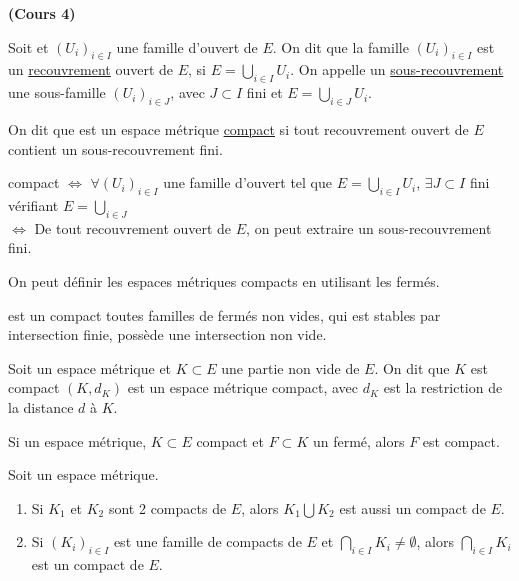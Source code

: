 \documentclass[12pt,a4paper]{article}
\begin{document}
\begin{flushleft}
\textbf{(Cours 4)}
\begin{mydef}
Soit \edm et $(U_i)_{i \in I}$ une famille d'ouvert de $E$. On dit que la famille $(U_i)_{i \in I}$ est un \underline{recouvrement} ouvert de $E$, si $E = \bigcup\limits_{i \in I} U_i$. On appelle un \underline{sous-recouvrement} une sous-famille $(U_i)_{i \in J}$, avec $J \subset I$ fini et $E = \bigcup\limits_{i \in J} U_i$.
\end{mydef}
 
\begin{mydef}
On dit que \edm est un espace métrique \underline{compact} si tout recouvrement ouvert de $E$ contient un sous-recouvrement fini.
\end{mydef} 
 
\begin{rem}
\edm compact $\Leftrightarrow$ $\forall (U_i)_{i \in I}$ une famille d'ouvert tel que $E = \bigcup\limits_{i \in I} U_i$, $\exists J \subset I$ fini vérifiant $E = \bigcup\limits_{i \in J}$\\$\Leftrightarrow$ De tout recouvrement ouvert de $E$, on peut extraire un sous-recouvrement fini.
\end{rem}

\begin{rem}
On peut définir les espaces métriques compacts en utilisant les fermés.
\end{rem}

\begin{thm}
\edm est un compact \ssi toutes familles de fermés non vides, qui est stables par intersection finie, possède une intersection non vide.
\end{thm}

\begin{mydef}
Soit \edm un espace métrique et $K \subset E$ une partie non vide de $E$. On dit que $K$ est compact \ssi $(K, d_K)$ est un espace métrique compact, avec $d_K$ est la restriction de la distance $d$ à $K$.
\end{mydef}


\begin{thm}
Si \edm un espace métrique, $K \subset E$ compact et $F \subset K$ un fermé, alors $F$ est compact.
\end{thm}

\begin{propriete}
Soit \edm un espace métrique.
\begin{enumerate}
\item Si $K_1$ et $K_2$ sont 2 compacts de $E$, alors $K_1 \bigcup K_2$ est aussi un compact de $E$.
\item Si $(K_i)_{i \in I}$ est une famille de compacts de $E$ et $\bigcap\limits_{i \in I} K_i \neq \emptyset$, alors $\bigcap\limits_{i \in I} K_i$ est un compact de $E$.
\end{enumerate}
\end{propriete}


\end{flushleft}
\end{document}
